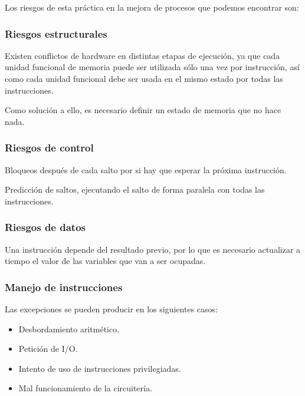 \documentclass[a4paper, 11pt, titlepage]{article}
\begin{document}
        Los riesgos de esta práctica en la mejora de procesos que podemos encontrar son:

        \subsubsection{Riesgos estructurales}

            Existen conflictos de hardware en distintas etapas de ejecución, ya que cada unidad funcional de memoria puede ser utilizada sólo 
            una vez por instrucción, así como cada unidad funcional debe ser usada en el mismo estado por todas las instrucciones.

            Como solución a ello, es necesario definir un estado de memoria que no hace nada.

        \subsubsection{Riesgos de control}

            Bloqueos después de cada salto por si hay que esperar la próxima instrucción.
            
            Predicción de saltos, ejecutando el salto de forma paralela con todas las instrucciones.

        \subsubsection{Riesgos de datos}

            Una instrucción depende del resultado previo, por lo que es necesario actualizar a tiempo el valor de las variables que van a ser 
            ocupadas.

        \subsubsection{Manejo de instrucciones}

            Las excepciones se pueden producir en los siguientes casos:

            \begin{itemize}
                \item Desbordamiento aritmético.
                \item Petición de I/O.
                \item Intento de uso de instrucciones privilegiadas.
                \item Mal funcionamiento de la circuitería.
            \end{itemize}
\end{document}
